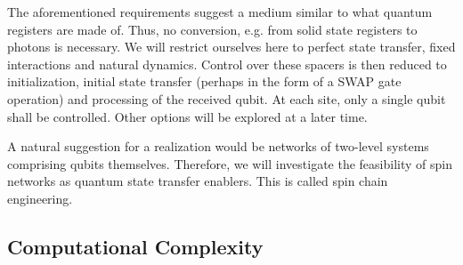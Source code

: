 \begin{center}
\end{center}

\noindent The aforementioned requirements suggest a medium similar to what quantum registers are made of. Thus, no conversion, e.g. from solid state registers to photons is necessary. We will restrict ourselves here to perfect state transfer, fixed interactions and natural dynamics. Control over these spacers is then reduced to initialization, initial state transfer (perhaps in the form of a SWAP gate operation) and processing of the received qubit. At each site, only a single qubit shall be controlled. Other options will be explored at a later time. \par
A natural suggestion for a realization would be networks of two-level systems comprising qubits themselves. Therefore, we will investigate the feasibility of spin networks as quantum state transfer enablers. This is called spin chain engineering.

\subsection{Computational Complexity}

\begin{center}
\end{center}

